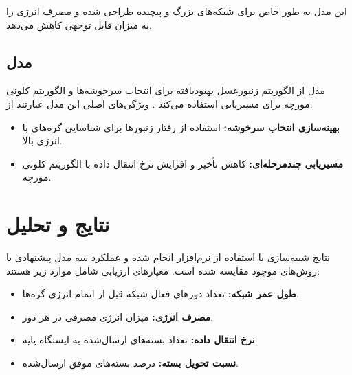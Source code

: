 \documentclass[12pt, onecolumn, a4paper]{article}
\begin{document}
این مدل به طور خاص برای شبکه‌های بزرگ و پیچیده طراحی شده و مصرف انرژی را به میزان قابل توجهی کاهش می‌دهد.

\subsection{مدل }
مدل  از الگوریتم زنبورعسل بهبودیافته برای انتخاب سرخوشه‌ها و الگوریتم کلونی مورچه برای مسیریابی استفاده می‌کند \cite{ref6, ref7}. ویژگی‌های اصلی این مدل عبارتند از:

\begin{itemize}
	\item \textbf{بهینه‌سازی انتخاب سرخوشه:} استفاده از رفتار زنبورها برای شناسایی گره‌های با انرژی بالا.
	\item \textbf{مسیریابی چندمرحله‌ای:} کاهش تأخیر و افزایش نرخ انتقال داده با الگوریتم کلونی مورچه.
\end{itemize}

\section{نتایج و تحلیل}

نتایج شبیه‌سازی با استفاده از نرم‌افزار  انجام شده و عملکرد سه مدل پیشنهادی با روش‌های موجود مقایسه شده است. معیارهای ارزیابی شامل موارد زیر هستند:
\begin{itemize}
	\item \textbf{طول عمر شبکه:} تعداد دورهای فعال شبکه قبل از اتمام انرژی گره‌ها.
	\item \textbf{مصرف انرژی:} میزان انرژی مصرفی در هر دور.
	\item \textbf{نرخ انتقال داده:} تعداد بسته‌های ارسال‌شده به ایستگاه پایه.
	\item \textbf{نسبت تحویل بسته:} درصد بسته‌های موفق ارسال‌شده.
\end{itemize}

\begin{table}[h!]
	\centering
	\caption{مقایسه عملکرد مدل‌های پیشنهادی}
	\label{table:results}
\end{table}
\end{document}
